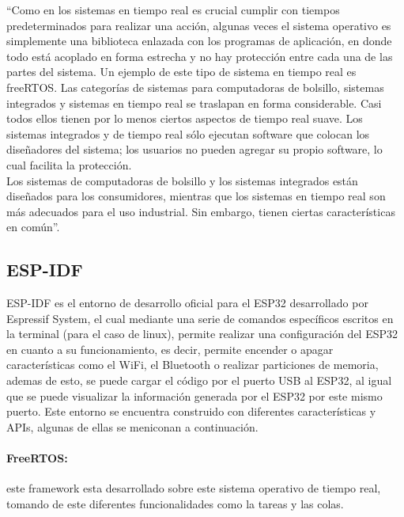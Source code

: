 ``Como en los sistemas en tiempo real es crucial cumplir con tiempos predeterminados para realizar una acción, algunas veces el sistema operativo es simplemente una biblioteca enlazada con los programas de aplicación, en donde todo está acoplado en forma estrecha y no hay protección entre cada una de las partes del sistema. Un ejemplo de este tipo de sistema en tiempo real es freeRTOS.  Las categorías de sistemas para computadoras de bolsillo, sistemas integrados y sistemas en tiempo real se traslapan en forma considerable. Casi todos ellos tienen por lo menos ciertos aspectos de tiempo real suave. Los sistemas integrados y de tiempo real sólo ejecutan software que colocan los diseñadores del sistema; los usuarios no pueden agregar su propio software, lo cual facilita la protección. \\

Los sistemas de computadoras de bolsillo y los sistemas integrados están diseñados para los consumidores, mientras que los sistemas en tiempo real son más adecuados para el uso industrial. Sin embargo, tienen ciertas características en común''. \cite{SO}

\subsection{ESP-IDF}

ESP-IDF es el entorno de desarrollo oficial para el ESP32 desarrollado por Espressif System, el cual mediante una serie de comandos específicos escritos en la terminal (para el caso de linux), permite realizar una configuración del ESP32 en cuanto a su funcionamiento, es decir, permite encender o apagar características como el WiFi, el Bluetooth o realizar particiones de memoria, ademas de esto, se puede cargar el código por el puerto USB al ESP32, al igual que se puede visualizar la información generada por el ESP32 por este mismo puerto. Este entorno se encuentra construido con diferentes características y APIs, algunas de ellas se meniconan a continuación. \cite{ES}

\paragraph{FreeRTOS:}este framework esta desarrollado sobre este sistema operativo de tiempo real, tomando de este diferentes funcionalidades como la tareas y las colas.


